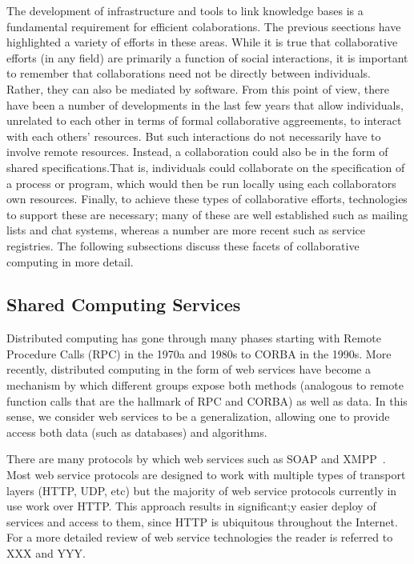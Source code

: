 \documentclass[12pt]{book}
\begin{document}
The development of infrastructure and tools to link knowledge bases is
a fundamental requirement for efficient colaborations. The previous
seections have highlighted a variety of efforts in these areas. While
it is true that collaborative efforts (in any field) are primarily a
function of social interactions, it is important to remember that
collaborations need not be directly between individuals. Rather, they
can also be mediated by software. From this point of view, there have
been a number of developments in the last few years that allow
individuals, unrelated to each other in terms of formal collaborative
aggreements, to interact with each others' resources. But such
interactions do not necessarily have to involve remote
resources. Instead, a collaboration could also be in the form of
shared specifications.That is, individuals could collaborate on the
specification of a process or program, which would then be run locally
using each collaborators own resources. Finally, to achieve these
types of collaborative efforts, technologies to support these are
necessary; many of these are well established such as mailing lists
and chat systems, whereas a number are more recent such as service
registries. The following subsections discuss these facets of
collaborative computing in more detail.

\subsection{Shared Computing Services}
\label{ref:ws}
Distributed computing has gone through many phases starting with
Remote Procedure Calls (RPC) in the 1970a and 1980s to CORBA in the
1990s. More recently, distributed computing in the form of web
services have become a mechanism by which different groups expose both
methods (analogous to remote function calls that are the hallmark of
RPC and CORBA) as well as data. In this sense, we consider web
services to be a generalization, allowing one to provide access both
data (such as databases) and algorithms.

There are many protocols by which web services such as SOAP and
XMPP~\cite{Wagener2009}. Most web service protocols are designed to
work with multiple types of transport layers (HTTP, UDP, etc) but the
majority of web service protocols currently in use work over
HTTP. This approach results in significant;y easier deploy of services
and access to them, since HTTP is ubiquitous throughout the
Internet. For a more detailed review of web service technologies the
reader is referred to XXX and YYY.
\end{document}

